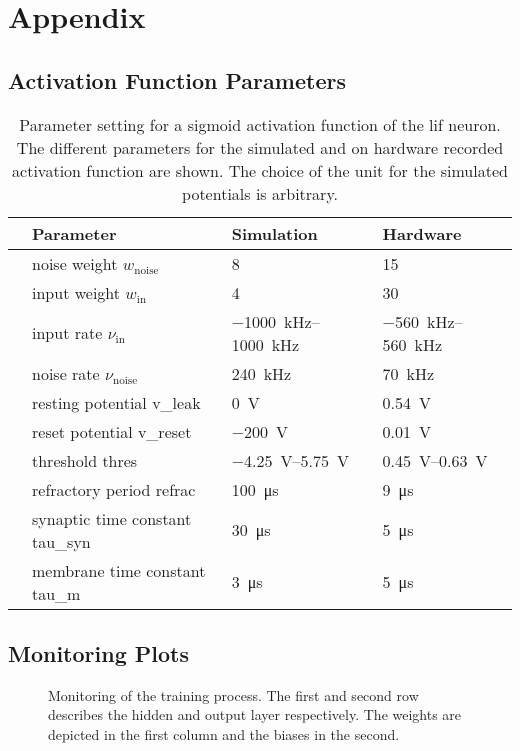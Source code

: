 \appendix
\chapter{Appendix}
\section{Activation Function Parameters}
\begin{table}[h!]\centering{}
	\begin{tabular}{@{}rlll@{}}\toprule
		& Parameter							& 	Simulation 				& 	Hardware 				\\ \midrule
		& noise weight $w_\text{noise}$		& 	8						&	15						\\
		& input weight $w_\text{in}$		&  	4						& 	30						\\
		& input rate $\nu_\text{in}$		&	\SIrange{-1000}{1000}{\kilo \Hz}& \SIrange{-560}{560}{\kilo \Hz}		\\
		& noise rate $\nu_\text{noise}$		&	\SI{240}{\kilo \Hz}		& 	\SI{70}{\kilo \Hz}		\\
		& resting potential \gls{v_leak}	&	\SI{0}{\V}				& 	\SI{0.54}{\V}			\\
		& reset potential \gls{v_reset}		&	\SI{-200}{\V}			& 	\SI{0.01}{\V}			\\
		& threshold \gls{thres}				&\SIrange{-4.25}{5.75}{\V}	& 	\SIrange{0.45}{0.63}{\V}\\
		& refractory period \gls{refrac}	&	\SI{100}{\micro \s}		&	\SI{9}{\micro \s}		\\
		& synaptic time constant \gls{tau_syn} 	&\SI{30}{\micro \s}		&	\SI{5}{\micro \s}		\\
		& membrane time constant \gls{tau_m}	&\SI{3}{\micro \s}		&	\SI{5}{\micro \s}		\\
		\bottomrule
	\end{tabular}
	\caption[Parameter setting for a sigmoid activation function of the \gls{lif} neuron.]{Parameter setting for a sigmoid activation function of the \gls{lif} neuron. The different parameters for the simulated and on hardware recorded activation function are shown. The choice of the unit for the simulated potentials is arbitrary.}
	\label{hardwarevssimulationtable}
\end{table}
\newpage
\section{Monitoring Plots}
\label{monitoringplots}
\begin{figure}[!htb]
	\centering
    
	\caption[Monitoring of the training process.]{Monitoring of the training process. The first and second row describes the hidden and output layer respectively. The weights are depicted in the first column and the biases in the second.}
	\label{network_monitoring}
\end{figure}